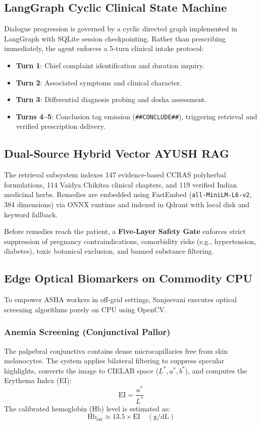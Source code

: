 \documentclass[conference]{IEEEtran}
\begin{document}
\subsection{LangGraph Cyclic Clinical State Machine}
Dialogue progression is governed by a cyclic directed graph implemented in LangGraph with SQLite session checkpointing. Rather than prescribing immediately, the agent enforces a 5-turn clinical intake protocol:
\begin{itemize}
    \item \textbf{Turn 1}: Chief complaint identification and duration inquiry.
    \item \textbf{Turn 2}: Associated symptoms and clinical character.
    \item \textbf{Turn 3}: Differential diagnosis probing and dosha assessment.
    \item \textbf{Turns 4--5}: Conclusion tag emission (\texttt{\#\#CONCLUDE\#\#}), triggering retrieval and verified prescription delivery.
\end{itemize}

\subsection{Dual-Source Hybrid Vector AYUSH RAG}
The retrieval subsystem indexes 147 evidence-based CCRAS polyherbal formulations, 114 Vaidya Chikitsa clinical chapters, and 119 verified Indian medicinal herbs. Remedies are embedded using FastEmbed (\texttt{all-MiniLM-L6-v2}, 384 dimensions) via ONNX runtime and indexed in Qdrant with local disk and keyword fallback. 

Before remedies reach the patient, a \textbf{Five-Layer Safety Gate} enforces strict suppression of pregnancy contraindications, comorbidity risks (e.g., hypertension, diabetes), toxic botanical exclusion, and banned substance filtering.

\subsection{Edge Optical Biomarkers on Commodity CPU}
To empower ASHA workers in off-grid settings, Sanjeevani executes optical screening algorithms purely on CPU using OpenCV.

\subsubsection{Anemia Screening (Conjunctival Pallor)}
The palpebral conjunctiva contains dense microcapillaries free from skin melanocytes. The system applies bilateral filtering to suppress specular highlights, converts the image to CIELAB space ($L^*, a^*, b^*$), and computes the Erythema Index (EI):
\begin{equation}
\text{EI} = \frac{a^*}{L^*}
\end{equation}
The calibrated hemoglobin ($\text{Hb}$) level is estimated as:
\begin{equation}
\text{Hb}_{\text{est}} \approx 13.5 \times \text{EI} \quad (\text{g/dL})
\end{equation}
\end{document}
